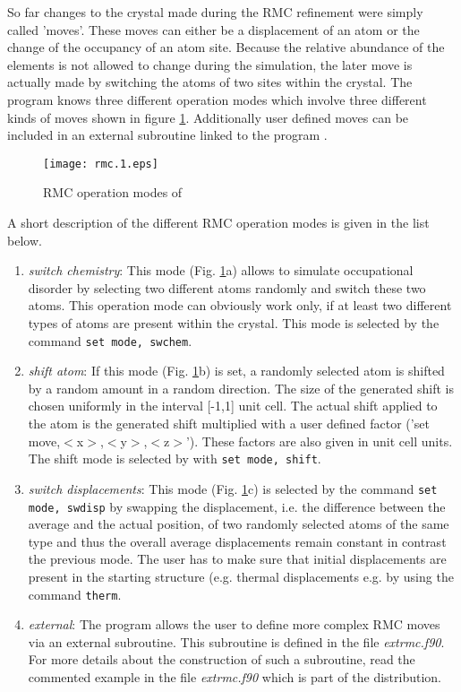 So far changes to the crystal made during the RMC refinement were
simply called 'moves'. These moves can either be a displacement of
an atom or the change of the occupancy of an atom site.  Because the
relative abundance of the elements is not allowed to change during
the simulation, the later move is actually made by switching the
atoms of two sites within the crystal. The program knows three
different operation modes which involve three different kinds of
moves shown in figure \ref{rmc-fig1}. Additionally user defined
moves can be included in an external subroutine linked to the
program \discus.
%
\begin{figure}[!tbh]
   \centering
   \texttt{[image: rmc.1.eps]}
   \caption{RMC operation modes of \Discus }
   \label{rmc-fig1}
\end{figure}
%
A short description of the different RMC operation modes is given in
the list below.
%
\begin{enumerate}
    \item {\it switch chemistry}:
    This mode (Fig. \ref{rmc-fig1}a) allows to simulate occupational disorder
    by selecting two different atoms randomly and switch these two atoms. This
    operation mode can obviously work only, if at least two different types of
    atoms are present within the crystal.  This mode is selected by the
    command {\tt set mode, swchem}.

    \item {\it shift atom}:
    If this mode (Fig.  \ref{rmc-fig1}b) is set, a randomly selected atom is
    shifted by a random amount in a random direction.  The size of the
    generated shift is chosen uniformly in the interval [-1,1] unit cell.
    The actual shift applied to the atom is the generated shift multiplied
    with a user defined factor ('set move,$<$x$>$,$<$y$>$,$<$z$>$').
    These factors are also given in unit cell units.  The shift mode is
    selected by with {\tt set mode, shift}.

    \item {\it switch displacements}:
    This mode (Fig. \ref{rmc-fig1}c) is selected by the command {\tt set
    mode, swdisp} by swapping the displacement, i.e.  the difference between
    the average and the actual position, of two randomly selected atoms of
    the same type and thus the overall average displacements remain constant
    in contrast the previous mode.  The user has to make sure that initial
    displacements are present in the starting structure (e.g.  thermal
    displacements e.g.  by using the command {\tt therm}.

    \item {\it external}:
    The program \Discus allows the user to define more complex RMC
    moves via an external subroutine.  This subroutine is defined in the file
    {\it extrmc.f90}. For more details about the construction of such a
    subroutine, read the commented example in the file {\it extrmc.f90}
    which is part of the distribution.
\end{enumerate}
